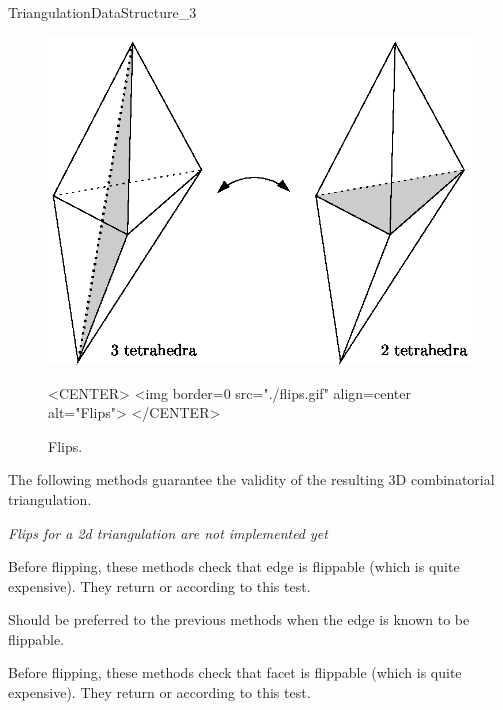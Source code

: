 \begin{ccRefConcept}{TriangulationDataStructure_3}
\begin{figure}
\begin{ccTexOnly}
\begin{center} 
\includegraphics{flips.eps}
\end{center}
\end{ccTexOnly}
\caption{Flips.
\label{TDS3-fig-flips}}
\begin{ccHtmlOnly}
<CENTER>
<img border=0 src="./flips.gif" align=center
alt="Flips">
</CENTER>
\end{ccHtmlOnly}
\end{figure} 

The following methods guarantee the validity of the resulting 3D
combinatorial triangulation.

\textit{Flips for a 2d triangulation are not implemented yet}

\ccGlue
{}
{Before flipping, these methods check that edge  is
flippable (which is quite expensive). They return  or
 according to this test.}

\ccGlue
{}
{Should be preferred to the previous methods when the edge is
known to be flippable.
}

\ccGlue
{}
{Before flipping, these methods check that facet  is
flippable (which is quite expensive). They return  or
 according to this test.} 


\end{ccRefConcept}
